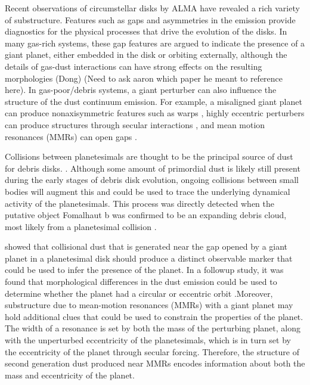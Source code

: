 \documentclass[twocolumn]{aastex63}
\begin{document}
Recent observations of circumstellar disks by ALMA have revealed a rich variety of substructure. Features such as gaps and asymmetries 
\citep{2015ApJ...808L...3A, 2016Sci...353.1519P, PhysRevLett.117.251101, 2016ApJ...820L..40A, 2016Natur.535..258C} in the emission provide 
diagnostics for the physical processes that drive the evolution of the disks. In many gas-rich systems, these gap features are argued to indicate the 
presence of a giant planet, either embedded in the disk \citep{2015MNRAS.453L..73D} or orbiting externally, although the details of gas-dust 
interactions can have strong effects on the resulting morphologies (Dong) (Need to ask aaron which paper he meant to reference here). In gas-poor/debris systems, a giant perturber can also influence the 
structure of the dust continuum emission. For example, a misaligned giant planet can produce nonaxisymmetric features such as warps \citep{2001A&A...370..447A}, highly eccentric perturbers can produce structures through secular interactions 
\citep{2014MNRAS.443.2541P, 2015MNRAS.448.3679P}, and mean motion resonances (MMRs) can open gaps
\citep{2015ApJ...798...83N, 2016ApJ...818..159T, 2018ApJ...857....3T}.

Collisions between planetesimals are thought to be the principal source of dust for debris disks. \citep[see][]{2008ARA&A..46..339W}.  Although some 
amount of primordial dust is likely still present during the early stages of debris disk evolution, ongoing collisions between small bodies will augment 
this and could be used to trace the underlying dynamical activity of the planetesimals. This process was directly detected when the putative object 
Fomalhaut b was confirmed to be an expanding debris cloud, most likely from a planetesimal collision \citep{2020PNAS..117.9712G}. 

\citet{2013ApJ...777L..31D} showed that collisional dust that is generated near the gap opened by a giant planet in a planetesimal disk should 
produce a distinct observable marker that could be used to infer the presence of the planet. In a followup study, it was found that morphological 
differences in the dust emission could be used to determine whether the planet had a circular or eccentric orbit \citep{2016ApJ...820...29D}.Moreover, 
substructure due to mean-motion resonances (MMRs) with a giant planet may hold additional clues that could be used to constrain the properties of 
the planet.  The width of a resonance is set by both the mass of the perturbing planet, along with the unperturbed eccentricity of the planetesimals, 
which is in turn set by the eccentricity of the planet through secular forcing. Therefore, the structure of second generation dust produced near MMRs 
encodes information about both the mass and eccentricity of the planet.
\end{document}
